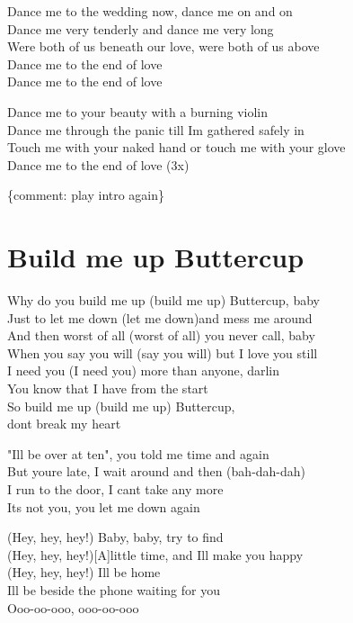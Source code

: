 \documentclass[
  letterpaper,
]{scrbook}
\begin{document}
Dance me to the wedding now, dance me on and on\\
Dance me very tenderly and dance me very long\\
We\textquotesingle re both of us beneath our love, we\textquotesingle re
both of us above\\
Dance me to the end of love\\
Dance me to the end of love

Dance me to your beauty with a burning violin\\
Dance me through the panic till I\textquotesingle m gathered safely in\\
Touch me with your naked hand or touch me with your glove\\
Dance me to the end of love (3x)

\{comment: play intro again\}

\hypertarget{build-me-up-buttercup}{%
\chapter{Build me up Buttercup}\label{build-me-up-buttercup}}

Why do you build me up (build me up) Buttercup, baby\\
Just to let me down (let me down)and mess me around\\
And then worst of all (worst of all) you never call, baby\\
When you say you will (say you will) but I love you still\\
I need you (I need you) more than anyone, darlin\textquotesingle{}\\
You know that I have from the start\\
So build me up (build me up) Buttercup,\\
don\textquotesingle t break my heart

"I\textquotesingle ll be over at ten", you told me time and again\\
But you\textquotesingle re late, I wait around and then (bah-dah-dah)\\
I run to the door, I can\textquotesingle t take any more\\
It\textquotesingle s not you, you let me down again

(Hey, hey, hey!) Baby, baby, try to find\\
(Hey, hey, hey!){[}A{]}little time, and I\textquotesingle ll make you
happy\\
(Hey, hey, hey!) I\textquotesingle ll be home\\
I\textquotesingle ll be beside the phone waiting for you\\
Ooo-oo-ooo, ooo-oo-ooo
\end{document}
